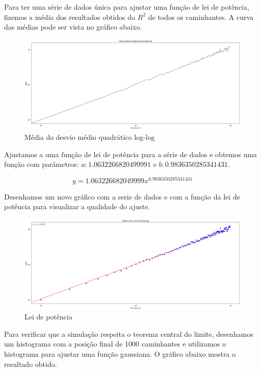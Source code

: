 Para ter uma série de dados única para ajustar uma função de lei de potência, fizemos a média dos resultados obtidos do $R^{2}$ de todos os caminhantes. A curva das médias pode ser vista no gráfico abaixo.

\begin{figure}[!htb]
  \centering
  \caption{Média do desvio médio quadrático log-log}
  \label{media_devio_medio}
  \includegraphics[width=1\textwidth]{figuras/output_2.png}
\end{figure}

Ajustamos a uma função de lei de potência para a série de dados e obtemos uma função com parâmetros:
$ a: 1.0632266820499991 $ e $ b: 0.9836350285341431 $. 

$$ y = 1.063226682049999x^{0.9836350285341431} $$

Desenhamos um novo gráfico com a serie de dados e com a função da lei de potência para visualizar a qualidade do ajuste.

\begin{figure}[!htb]
  \centering
  \caption{Lei de potência}
  \label{curva_lei_potencia}
  \includegraphics[width=1\textwidth]{figuras/output_3.png}
\end{figure}

Para verificar que a simulação respeita o teorema central do limite, desenhamos um histograma com a posição final de 1000 caminhantes e utilizamos o histograma para ajustar uma função gaussiana. O gráfico abaixo mostra o resultado obtido. 

